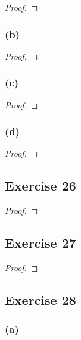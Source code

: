 \documentclass[14pt]{extarticle}
\begin{document}
\begin{proof}

\end{proof}

\subsubsection{(b)}

\begin{proof}

\end{proof}

\subsubsection{(c)}

\begin{proof}

\end{proof}

\subsubsection{(d)}

\begin{proof}

\end{proof}

\subsection{Exercise 26}

\begin{proof}

\end{proof}

\subsection{Exercise 27}

\begin{proof}

\end{proof}

\subsection{Exercise 28}

\subsubsection{(a)}
\end{document}

